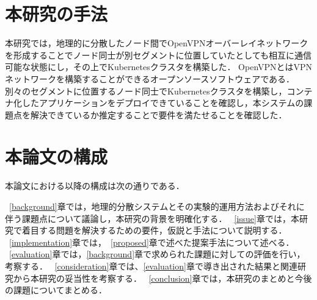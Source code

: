 \section{本研究の手法}
本研究では，地理的に分散したノード間でOpenVPNオーバーレイネットワークを形成することでノード同士が別セグメントに位置していたとしても相互に通信可能な状態にし，その上でKubernetesクラスタを構築した．
OpenVPNとはVPNネットワークを構築することができるオープンソースソフトウェアである．
別々のセグメントに位置するノード同士でKubernetesクラスタを構築し，コンテナ化したアプリケーションをデプロイできていることを確認し，本システムの課題点を解決できているか推定することで要件を満たせることを確認した．


\section{本論文の構成}
本論文における以降の構成は次の通りである．

~\ref{background}章では，地理的分散システムとその実験的運用方法およびそれに伴う課題点について議論し，本研究の背景を明確化する．
~\ref{issue}章では，本研究で着目する問題を解決するための要件，仮説と手法について説明する．
~\ref{implementation}章では，~\ref{proposed}章で述べた提案手法について述べる．
~\ref{evaluation}章では，\ref{background}章で求められた課題に対しての評価を行い，考察する．
~\ref{consideration}章では、\ref{evaluation}章で導き出された結果と関連研究から本研究の妥当性を考察する．
~\ref{conclusion}章では，本研究のまとめと今後の課題についてまとめる．


